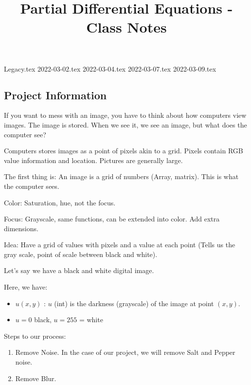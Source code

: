 \documentclass{article}
\title{Partial Differential Equations - Class Notes} %
\begin{document}
\maketitle
\newpage

{Legacy.tex}
{2022-03-02.tex}
{2022-03-04.tex}
{2022-03-07.tex}
{2022-03-09.tex}


\subsection*{Project Information}

If you want to mess with an image, you have to think about how computers view images. The image is stored. When we see it, we see an image, but what does the computer see?

Computers stores images as a point of pixels akin to a grid. Pixels contain RGB value information and location. Pictures are generally large.

The first thing is: An image is a grid of numbers (Array, matrix). This is what the computer sees.

Color: Saturation, hue, not the focus.

Focus: Grayscale, same functions, can be extended into color. Add extra dimensions.

Idea: Have a grid of values with pixels and a value at each point (Tells us the gray scale, point of scale between black and white).

\bigbreak


Let's say we have a black and white digital image.


Here, we have:

\begin{itemize}
  \item $u(x, y)$ : $u$ (int) is the darkness (grayscale) of the image at point $(x, y)$.
  \item $u = 0$ black, $u = 255$ = white
\end{itemize}

Steps to our process:
%
\begin{enumerate}
  \item Remove Noise. In the case of our project, we will remove Salt and Pepper noise.
  \item Remove Blur.
\end{enumerate}
\end{document}
